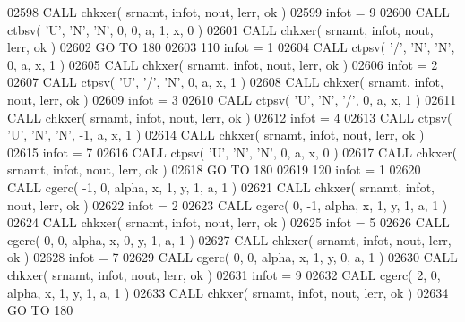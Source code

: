 \begin{DoxyCode}
02598       \textcolor{keyword}{CALL }chkxer( srnamt, infot, nout, lerr, ok )
02599       infot = 9
02600       \textcolor{keyword}{CALL }ctbsv( \textcolor{stringliteral}{'U'}, \textcolor{stringliteral}{'N'}, \textcolor{stringliteral}{'N'}, 0, 0, a, 1, x, 0 )
02601       \textcolor{keyword}{CALL }chkxer( srnamt, infot, nout, lerr, ok )
02602       \textcolor{keywordflow}{GO TO} 180
02603   110 infot = 1
02604       \textcolor{keyword}{CALL }ctpsv( \textcolor{stringliteral}{'/'}, \textcolor{stringliteral}{'N'}, \textcolor{stringliteral}{'N'}, 0, a, x, 1 )
02605       \textcolor{keyword}{CALL }chkxer( srnamt, infot, nout, lerr, ok )
02606       infot = 2
02607       \textcolor{keyword}{CALL }ctpsv( \textcolor{stringliteral}{'U'}, \textcolor{stringliteral}{'/'}, \textcolor{stringliteral}{'N'}, 0, a, x, 1 )
02608       \textcolor{keyword}{CALL }chkxer( srnamt, infot, nout, lerr, ok )
02609       infot = 3
02610       \textcolor{keyword}{CALL }ctpsv( \textcolor{stringliteral}{'U'}, \textcolor{stringliteral}{'N'}, \textcolor{stringliteral}{'/'}, 0, a, x, 1 )
02611       \textcolor{keyword}{CALL }chkxer( srnamt, infot, nout, lerr, ok )
02612       infot = 4
02613       \textcolor{keyword}{CALL }ctpsv( \textcolor{stringliteral}{'U'}, \textcolor{stringliteral}{'N'}, \textcolor{stringliteral}{'N'}, -1, a, x, 1 )
02614       \textcolor{keyword}{CALL }chkxer( srnamt, infot, nout, lerr, ok )
02615       infot = 7
02616       \textcolor{keyword}{CALL }ctpsv( \textcolor{stringliteral}{'U'}, \textcolor{stringliteral}{'N'}, \textcolor{stringliteral}{'N'}, 0, a, x, 0 )
02617       \textcolor{keyword}{CALL }chkxer( srnamt, infot, nout, lerr, ok )
02618       \textcolor{keywordflow}{GO TO} 180
02619   120 infot = 1
02620       \textcolor{keyword}{CALL }cgerc( -1, 0, alpha, x, 1, y, 1, a, 1 )
02621       \textcolor{keyword}{CALL }chkxer( srnamt, infot, nout, lerr, ok )
02622       infot = 2
02623       \textcolor{keyword}{CALL }cgerc( 0, -1, alpha, x, 1, y, 1, a, 1 )
02624       \textcolor{keyword}{CALL }chkxer( srnamt, infot, nout, lerr, ok )
02625       infot = 5
02626       \textcolor{keyword}{CALL }cgerc( 0, 0, alpha, x, 0, y, 1, a, 1 )
02627       \textcolor{keyword}{CALL }chkxer( srnamt, infot, nout, lerr, ok )
02628       infot = 7
02629       \textcolor{keyword}{CALL }cgerc( 0, 0, alpha, x, 1, y, 0, a, 1 )
02630       \textcolor{keyword}{CALL }chkxer( srnamt, infot, nout, lerr, ok )
02631       infot = 9
02632       \textcolor{keyword}{CALL }cgerc( 2, 0, alpha, x, 1, y, 1, a, 1 )
02633       \textcolor{keyword}{CALL }chkxer( srnamt, infot, nout, lerr, ok )
02634       \textcolor{keywordflow}{GO TO} 180

\end{DoxyCode}
